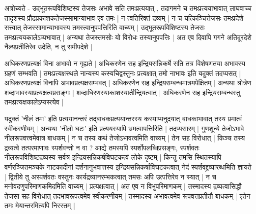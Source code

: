 अत्रोच्यते - उद्भूतरूपविशिष्टस्य तेजसः अभावे सति तमःप्रत्ययात् , तदागमने च तमःप्रत्ययाभावात् लाघवाच्च तादृशस्य प्रौढप्रकाशकतेजस्सामान्याभाव एव तमः | न त्वतिरिक्तं द्रव्यम् | न च यत्किञ्चित्तेजसः तमःप्रदेशे सत्त्वात् तेजस्सामान्याभावस्य तमस्त्वानुपपत्तिरिति वाच्यम् | उद्भूतरूपविशिष्टस्य तेजसः तमःप्रत्ययकालेऽप्यभावात् | अन्यथा तेजस्तमसोः यो विरोधः तस्यानुपपत्तिः | अत एव दिवापि गगने अतिदूरदेशे नैल्यप्रतीतिरेव उदेति, न तु समीपदेशे | 
 
अधिकरणप्रत्यक्षं विना अभावो न गृह्यते | अधिकरणेन सह इन्द्रियसन्निकर्षे सति तत्र विशेषणतया अभावस्य ग्रहणं सम्भवति | तमःप्रत्यक्षस्थले नान्यस्य कस्यचिद्वस्तुनः प्रत्यक्षात् तमो नाभावः इति यदुक्तं तदप्यसत् | अधिकरणप्रत्यक्षं विनापि अभावप्रत्यक्षसम्भवत् | अधिकरणेन सह इन्द्रियसम्बन्धमात्रमपेक्षितम् | अन्यथा श्रोत्रेण शब्दाभावस्याप्रत्यक्षत्वप्रसङ्गः | शब्दाधिरणस्याकाशस्यातीन्द्रियत्वात् | अधिकरणेन सह इन्द्रियसम्बन्धस्तु तमःप्रत्यक्षकालेऽप्यस्त्येव |

यदुक्तं 'नीलं तमः' इति प्रत्ययानन्तरं तद्बाधकप्रत्ययान्तरस्य कस्याप्यनुदयात् बाधकाभावात् तस्य प्रमात्वं स्वीकरणीयम् | अन्यथा 'नीलो घटः' इति प्रत्ययस्यापि भ्रमत्वापत्तिरिति | तदप्यसारम् | गुणशून्ये तेजोऽभावे नीलरूपवत्त्वमेवात्र बाधकम् | न च तस्य कथं तेजोऽभावत्वमिति वाच्यम् | तेन सह विरोधात् | किञ्च तस्य द्रव्यत्वे तत्परमाणावः स्पर्शवन्तो न वा ? आद्ये तमस्यपि स्पर्शोपलब्धिप्रसङ्गः, स्पर्शवतः नीलरूपविशिष्टद्रव्यस्य सर्वत्र इन्द्रियसन्निकर्षविघटकत्वं लोके दृष्टम् | किन्तु तमसि स्थितस्यापि वर्णरञ्जितमञ्चके नाटकादीनां दर्शनानुभवात्तस्य इन्द्रियसन्निकर्षाविघटकत्वात् नेदं स्पर्शवद्द्रव्यारब्धमिति ज्ञायते | द्वितीये तु अस्पर्शवतः वस्तुनः कार्यद्रव्यानरम्भकत्वात् तमसः अपि उत्पत्तिरेव न स्यात् | न च मनोवदणुपरिमाणकमिदमिति वाच्यम् | प्रत्यक्षत्वात् | अत एव न विभुपरिमाणकम् | तस्मादस्य द्रव्यत्वासिद्धौ तेजसा सह विरोधात् तदभावरूपत्वमेव स्वीकरणीयम् | तस्मादस्य अभावत्वमेव रूपवत्तप्रतीतौ बाधकम् | एतेन तमः मेयान्तरमित्यपि निरस्तम् |

